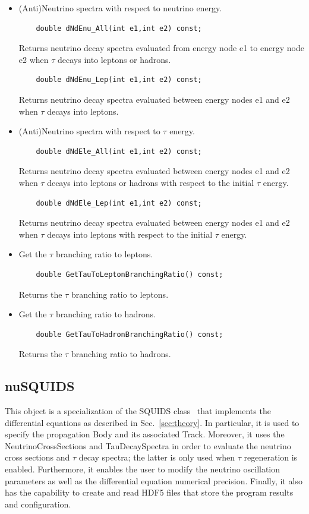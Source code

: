 \documentclass[3p,12pt]{elsarticle}
\newcommand{\ttf}{\ttfamily}
\begin{document}
\begin{itemize}
\item (Anti)Neutrino spectra with respect to neutrino energy.
  \begin{lstlisting}
    double dNdEnu_All(int e1,int e2) const;
  \end{lstlisting}
  Returns neutrino decay spectra evaluated from energy node
  {\ttfamily e1} to energy node {\ttfamily e2} when $\tau$ decays into
  leptons or hadrons.  
  \begin{lstlisting}
    double dNdEnu_Lep(int e1,int e2) const;
  \end{lstlisting}
  Returns neutrino decay spectra evaluated between energy nodes
  {\ttfamily e1} and {\ttfamily e2} when $\tau$ decays into leptons. 
\item (Anti)Neutrino spectra with respect to $\tau$ energy.
  \begin{lstlisting}
    double dNdEle_All(int e1,int e2) const;
  \end{lstlisting}
  Returns neutrino decay spectra evaluated between energy nodes
  {\ttfamily e1} and {\ttfamily e2} when $\tau$ decays into leptons
  or hadrons with respect to the initial $\tau$ energy.
  \begin{lstlisting}
    double dNdEle_Lep(int e1,int e2) const;
  \end{lstlisting}
  Returns neutrino decay spectra evaluated between energy nodes
  {\ttfamily e1} and {\ttfamily e2} when $\tau$ decays into
  leptons with respect to the initial $\tau$ energy.
\item Get the $\tau$ branching ratio to leptons.
  \begin{lstlisting}
    double GetTauToLeptonBranchingRatio() const;
  \end{lstlisting}
  Returns the $\tau$ branching ratio to leptons.
\item Get the $\tau$ branching ratio to hadrons.
  \begin{lstlisting}
    double GetTauToHadronBranchingRatio() const;
  \end{lstlisting}
  Returns the $\tau$ branching ratio to hadrons.
\end{itemize}

\subsection{nuSQUIDS\label{sec:nusquids}}

This object is a specialization of the {\ttf SQUIDS} class~\citep{SQUIDS} that implements the
differential equations as described in Sec.~\ref{sec:theory}. In
particular, it is used to specify the propagation {\ttf Body} and its
associated {\ttf Track}. Moreover, it uses the {\ttf
  NeutrinoCrossSections} and {\ttf TauDecaySpectra} in order to
evaluate the neutrino cross sections and $\tau$ decay spectra; the
latter is only used when {\it $\tau$} regeneration is
enabled. Furthermore, it enables the user to modify the neutrino
oscillation parameters as well as the differential equation numerical
precision. Finally, it also has the capability to create and read HDF5
files that store the program results and configuration. 
\end{document}
